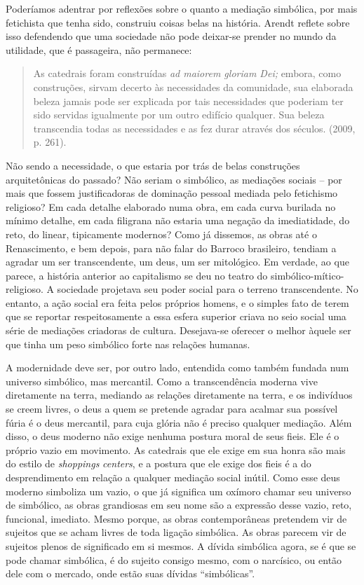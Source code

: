 Poderíamos adentrar por reflexões sobre o quanto a mediação simbólica,
por mais fetichista que tenha sido, construiu coisas belas na história.
Arendt reflete sobre isso defendendo que uma sociedade não pode
deixar-se prender no mundo da utilidade, que é passageira, não
permanece:

\begin{quote}
As catedrais foram construídas \emph{ad maiorem gloriam Dei;} embora,
como construções, sirvam decerto às necessidades da comunidade, sua
elaborada beleza jamais pode ser explicada por tais necessidades que
poderiam ter sido servidas igualmente por um outro edifício qualquer.
Sua beleza transcendia todas as necessidades e as fez durar através dos
séculos. (2009, p. 261).
\end{quote}

Não sendo a necessidade, o que estaria por trás de belas construções
arquitetônicas do passado? Não seriam o simbólico, as mediações sociais
-- por mais que fossem justificadoras de dominação pessoal mediada pelo
fetichismo religioso? Em cada detalhe elaborado numa obra, em cada curva
burilada no mínimo detalhe, em cada filigrana não estaria uma negação da
imediatidade, do reto, do linear, tipicamente modernos? Como já
dissemos, as obras até o Renascimento, e bem depois, para não falar do
Barroco brasileiro, tendiam a agradar um ser transcendente, um deus, um
ser mitológico. Em verdade, ao que parece, a história anterior ao
capitalismo se deu no teatro do simbólico-mítico-religioso. A sociedade
projetava seu poder social para o terreno transcendente. No entanto, a
ação social era feita pelos próprios homens, e o simples fato de terem
que se reportar respeitosamente a essa esfera superior criava no seio
social uma série de mediações criadoras de cultura. Desejava-se oferecer
o melhor àquele ser que tinha um peso simbólico forte nas relações
humanas.

A modernidade deve ser, por outro lado, entendida como também fundada
num universo simbólico, mas mercantil. Como a transcendência moderna
vive diretamente na terra, mediando as relações diretamente na terra, e
os indivíduos se creem livres, o deus a quem se pretende agradar para
acalmar sua possível fúria é o deus mercantil, para cuja glória não é
preciso qualquer mediação. Além disso, o deus moderno não exige nenhuma
postura moral de seus fieis. Ele é o próprio vazio em movimento. As
catedrais que ele exige em sua honra são mais do estilo de
\emph{shoppings} \emph{centers}, e a postura que ele exige dos fieis é a
do desprendimento em relação a qualquer mediação social inútil. Como
esse deus moderno simboliza um vazio, o que já significa um oxímoro
chamar seu universo de simbólico, as obras grandiosas em seu nome são a
expressão desse vazio, reto, funcional, imediato. Mesmo porque, as obras
contemporâneas pretendem vir de sujeitos que se acham livres de toda
ligação simbólica. As obras parecem vir de sujeitos plenos de
significado em si mesmos. A dívida simbólica agora, se é que se pode
chamar simbólica, é do sujeito consigo mesmo, com o narcísico, ou então
dele com o mercado, onde estão suas dívidas ``simbólicas''.

